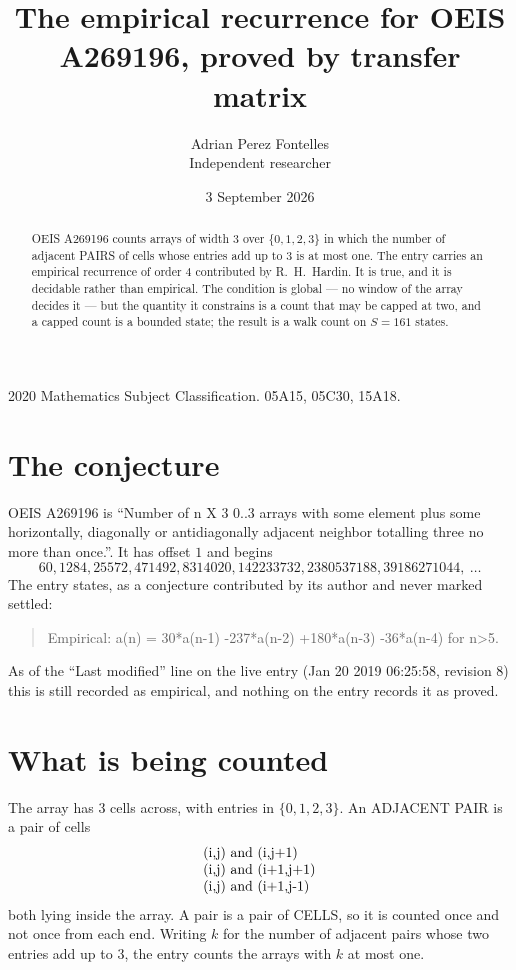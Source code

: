\documentclass[11pt,a4paper]{article}
\title{The empirical recurrence for OEIS A269196, proved by transfer matrix}
\author{Adrian Perez Fontelles\\ \small Independent researcher}
\date{3 September 2026}
\theoremstyle{plain}
\theoremstyle{definition}
\begin{document}
\maketitle

\begin{abstract}
OEIS A269196 counts arrays of width $3$ over $\{0,1,2,3\}$ in which the number of adjacent PAIRS of
cells whose entries add up to $3$ is at most one. The entry carries an empirical recurrence of
order $4$ contributed by R.~H.~Hardin. It is true, and it is decidable rather than
empirical. The condition is global --- no window of the array decides it --- but the quantity
it constrains is a count that may be capped at two, and a capped count is a bounded state; the
result is a walk count on $S=161$ states.
\end{abstract}

\noindent\small 2020 Mathematics Subject Classification. 05A15, 05C30, 15A18.\normalsize

\section{The conjecture}

OEIS A269196 is ``Number of n X 3 0..3 arrays with some element plus some horizontally, diagonally or antidiagonally adjacent neighbor totalling three no more than once.''. It has offset $1$ and begins
\[
60, 1284, 25572, 471492, 8314020, 142233732, 2380537188, 39186271044,\ \dots
\]
The entry states, as a conjecture contributed by its author and never marked settled:
\begin{quote}
Empirical: a(n) = 30*a(n-1) -237*a(n-2) +180*a(n-3) -36*a(n-4) for n>5.
\end{quote}
As of the ``Last modified'' line on the live entry (Jan 20 2019 06:25:58, revision 8) this is still
recorded as empirical, and nothing on the entry records it as proved.

\section{What is being counted}

The array has $3$ cells across, with entries in $\{0,1,2,3\}$. An ADJACENT PAIR is a pair of cells
\[
\begin{array}{l}
$(i,j)\text{ and }(i,j{+}1)$ \\
$(i,j)\text{ and }(i{+}1,j{+}1)$ \\
$(i,j)\text{ and }(i{+}1,j{-}1)$ \\
\end{array}
\]
both lying inside the array. A pair is a pair of CELLS, so it is counted once and not once from
each end. Writing $k$ for the number of adjacent pairs whose two entries add up to $3$, the
entry counts the arrays with $k$ at most one.
\end{document}
